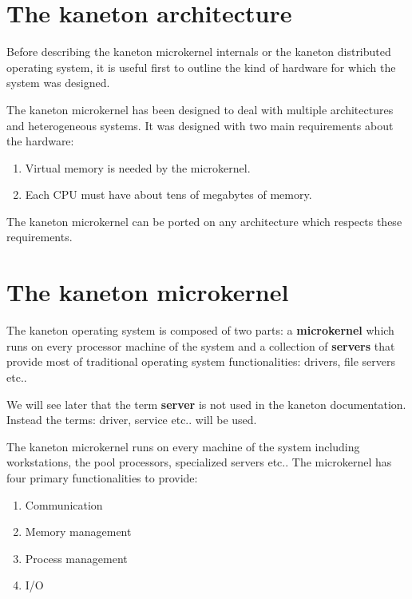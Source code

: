 \documentclass[10pt,a4wide]{article}
\begin{document}
\begin{multicols}{2}
\section{The kaneton architecture}

Before describing the kaneton microkernel internals or the kaneton distributed
operating system, it is useful first to outline the kind of hardware for
which the system was designed.

The kaneton microkernel has been designed to deal with multiple architectures
and heterogeneous systems. It was designed with two main requirements about the
hardware:

\begin{enumerate}

\item Virtual memory is needed by the microkernel.
\item Each CPU must have about tens of megabytes of memory.

\end{enumerate}

The kaneton microkernel can be ported on any architecture which respects these
requirements.



\section{The kaneton microkernel}

The kaneton operating system is composed of two parts: a \textbf{microkernel}
which runs on every processor machine of the system and a collection of
\textbf{servers} that provide most of traditional operating system
functionalities: drivers, file servers etc..

We will see later that the term \textbf{server} is not used in the kaneton
documentation. Instead the terms: driver, service etc.. will be used.

The kaneton microkernel runs on every machine of the system including
workstations, the pool processors, specialized servers etc.. The microkernel
has four primary functionalities to provide:

\begin{enumerate}

\item Communication
\item Memory management
\item Process management
\item I/O


\end{enumerate}
\end{multicols}
\end{document}
